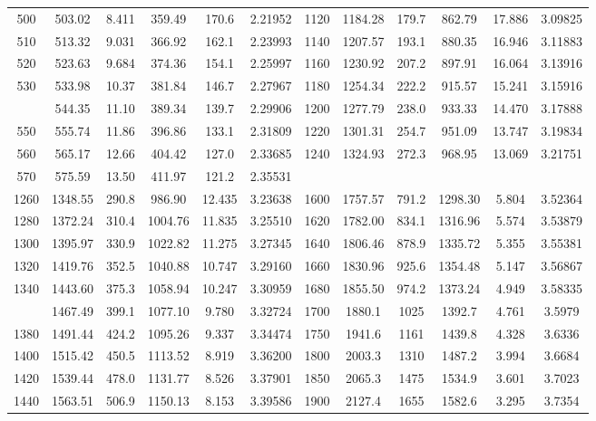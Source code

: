 \documentclass[12pt,a3paper]{article}
\begin{document}
\begin{enumerate}
\begin{center}
\begin{longtable}{cccccc|cccccc}
500 & 503.02 & 8.411 & 359.49 & 170.6 & 2.21952 & 1120 & 1184.28 & 179.7 & 862.79 & 17.886 & 3.09825 \\
510 & 513.32 & 9.031 & 366.92 & 162.1 & 2.23993 & 1140 & 1207.57 & 193.1 & 880.35 & 16.946 & 3.11883 \\
520 & 523.63 & 9.684 & 374.36 & 154.1 & 2.25997 & 1160 & 1230.92 & 207.2 & 897.91 & 16.064 & 3.13916 \\
530 & 533.98 & 10.37 & 381.84 & 146.7 & 2.27967 & 1180 & 1254.34 & 222.2 & 915.57 & 15.241 & 3.15916 \\
\addlinespace
540 & 544.35 & 11.10 & 389.34 & 139.7 & 2.29906 & 1200 & 1277.79 & 238.0 & 933.33 & 14.470 & 3.17888 \\
550 & 555.74 & 11.86 & 396.86 & 133.1 & 2.31809 & 1220 & 1301.31 & 254.7 & 951.09 & 13.747 & 3.19834 \\
560 & 565.17 & 12.66 & 404.42 & 127.0 & 2.33685 & 1240 & 1324.93 & 272.3 & 968.95 & 13.069 & 3.21751 \\
570 & 575.59 & 13.50 & 411.97 & 121.2 & 2.35531 &  &  &  &  &  &  \\
\midrule
1260 & 1348.55 & 290.8 & 986.90 & 12.435 & 3.23638 & 1600 & 1757.57 & 791.2 & 1298.30 & 5.804 & 3.52364 \\
1280 & 1372.24 & 310.4 & 1004.76 & 11.835 & 3.25510 & 1620 & 1782.00 & 834.1 & 1316.96 & 5.574 & 3.53879 \\
1300 & 1395.97 & 330.9 & 1022.82 & 11.275 & 3.27345 & 1640 & 1806.46 & 878.9 & 1335.72 & 5.355 & 3.55381 \\
1320 & 1419.76 & 352.5 & 1040.88 & 10.747 & 3.29160 & 1660 & 1830.96 & 925.6 & 1354.48 & 5.147 & 3.56867 \\
1340 & 1443.60 & 375.3 & 1058.94 & 10.247 & 3.30959 & 1680 & 1855.50 & 974.2 & 1373.24 & 4.949 & 3.58335 \\
\addlinespace
1360 & 1467.49 & 399.1 & 1077.10 & 9.780 & 3.32724 & 1700 & 1880.1 & 1025 & 1392.7 & 4.761 & 3.5979 \\
1380 & 1491.44 & 424.2 & 1095.26 & 9.337 & 3.34474 & 1750 & 1941.6 & 1161 & 1439.8 & 4.328 & 3.6336 \\
1400 & 1515.42 & 450.5 & 1113.52 & 8.919 & 3.36200 & 1800 & 2003.3 & 1310 & 1487.2 & 3.994 & 3.6684 \\
1420 & 1539.44 & 478.0 & 1131.77 & 8.526 & 3.37901 & 1850 & 2065.3 & 1475 & 1534.9 & 3.601 & 3.7023 \\
1440 & 1563.51 & 506.9 & 1150.13 & 8.153 & 3.39586 & 1900 & 2127.4 & 1655 & 1582.6 & 3.295 & 3.7354 \\

\end{longtable}
\end{center}
\end{enumerate}
\end{document}
